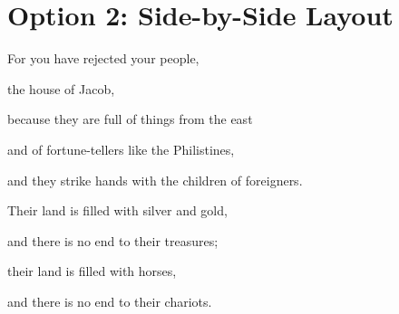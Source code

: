\documentclass[11pt]{article}
\begin{document}
\section{Option 2: Side-by-Side Layout}
\begin{biblicaloutline}

\begin{versewithsidenote}[A]
 For you have rejected your people,

\poetryline the house of Jacob,

because they are full of things from the east

\poetryline and of fortune-tellers like the Philistines,

\poetryline and they strike hands with the children of foreigners.
\end{versewithsidenote}

\begin{versewithsidenote}[B]
 Their land is filled with silver and gold,

\poetryline and there is no end to their treasures;

their land is filled with horses,

\poetryline and there is no end to their chariots.
\end{versewithsidenote}
\end{biblicaloutline}

\newpage
\end{document}

